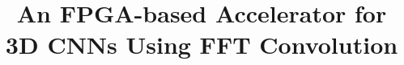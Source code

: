 \documentclass[
  10pt,
  journal,
  compsoc,
]{IEEEtran}
\begin{document}

\title{An FPGA-based Accelerator for 3D CNNs Using FFT Convolution}
\author{}

\makeatletter
\makeatother

\newif\ifjournal\journalfalse


\maketitle
\IEEEdisplaynontitleabstractindextext






\end{document}
